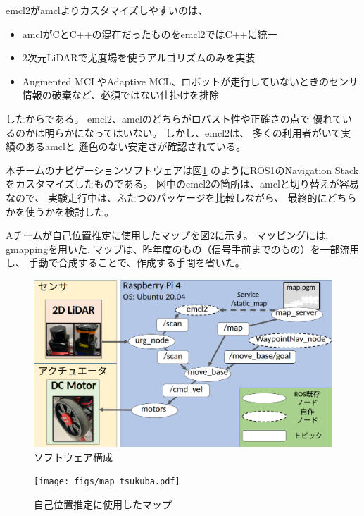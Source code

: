\documentclass[twocolumn,9pt]{jsproceedings}
\begin{document}
emcl2がamclよりカスタマイズしやすいのは、
\begin{itemize}
	\item amclがCとC++の混在だったものをemcl2ではC++に統一
	\item 2次元LiDARで尤度場を使うアルゴリズムのみを実装
	\item Augmented MCL\cite{gutmann2002}やAdaptive MCL\cite{fox2003}、ロボットが走行していないときのセンサ情報の破棄など、必須ではない仕掛けを排除
\end{itemize}
したからである。
emcl2、amclのどちらがロバスト性や正確さの点で
優れているのかは明らかになってはいない。
しかし、emcl2は、
多くの利用者がいて実績のあるamclと
遜色のない安定さが確認されている。


本チームのナビゲーションソフトウェアは図\ref{fig:software}
のようにROS1のNavigation Stackをカスタマイズしたものである。
図中のemcl2の箇所は、amclと切り替えが容易なので、
実験走行中は、ふたつのパッケージを比較しながら、
最終的にどちらかを使うかを検討した。

Aチームが自己位置推定に使用したマップを図\ref{fig:map_tsukuba}に示す。
マッピングには, gmappingを用いた. 
マップは、昨年度のもの（信号手前までのもの）を一部流用し、
手動で合成することで、作成する手間を省いた。

\begin{figure}[h]
  \begin{center}
    \includegraphics[width=1.0\linewidth]{figs/software.pdf}
    \caption{ソフトウェア構成}
    \label{fig:software}
  \end{center}
\end{figure}


\begin{figure}[h]
  \begin{center}
    \texttt{[image: figs/map\_tsukuba.pdf]}
    \caption{自己位置推定に使用したマップ}
    \label{fig:map_tsukuba}
  \end{center}
\end{figure}
\end{document}
